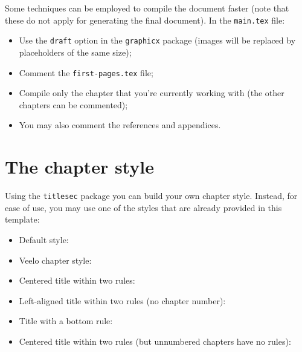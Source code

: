 Some techniques can be employed to compile the document faster (note that these do not apply for generating the final document).
In the \verb+main.tex+ file:

\begin{itemize}
\item Use the \verb+draft+ option in the \verb+graphicx+ package (images will be replaced by placeholders of the same size);
\item Comment the \verb+first-pages.tex+ file;
\item Compile only the chapter that you're currently working with (the other chapters can be commented);
\item You may also comment the references and appendices.
\end{itemize}


\section{The chapter style}
\label{c2:s:the-chapter-style}

Using the \verb+titlesec+ package you can build your own chapter style.
Instead, for ease of use, you may use one of the styles that are already provided in this template:

\begin{itemize}

\item
Default style:\\
\verb++

\item
Veelo chapter style:\\
\verb++

\item
Centered title within two rules:\\
\verb++

\item
Left-aligned title within two rules (no chapter number):\\
\verb++

\item
Title with a bottom rule:\\
\verb++

\item
Centered title within two rules (but unnumbered chapters have no rules):\\
\verb++

\end{itemize}

